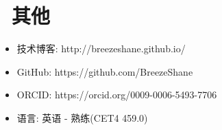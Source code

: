 \documentclass{resume}
\begin{document}
\section{\faInfo\ 其他}
\begin{itemize}[parsep=0.5ex]
  \item 技术博客: http://breezeshane.github.io/
  \item GitHub: https://github.com/BreezeShane
  \item ORCID: https://orcid.org/0009-0006-5493-7706
  \item 语言: 英语 - 熟练(CET4 459.0)
\end{itemize}

%
%
\end{document}
